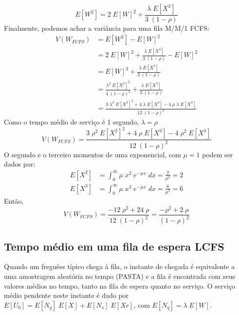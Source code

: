 \documentclass[a4paper]{article}
\newcommand{\E}[1]{E\!\left[#1\right]}
\begin{document}
\[
    \E{W^2}
    = 2 \; \E{W}^2 + \frac{\lambda \; \E{X^3}}{3 \; (1 - \rho)}
\]
Finalmente, podemos achar a variância para uma fila M/M/1 FCFS:
\begin{align*}
    V(W_{FCFS}) &= \E{W^2} - \E{W}^2 \\
    &= 2 \; \E{W}^2 + \frac{\lambda \; \E{X^3}}{3 \; (1 - \rho)}
        - \E{W}^2 \\
    &= \E{W}^2 + \frac{\lambda \; \E{X^3}}{3 \; (1 - \rho)} \\
    &= \frac{\lambda^2 \; \E{X^2}^2}{4 \; (1 - \rho)^2}
        + \frac{\lambda \; \E{X^3}}{3 \; (1 - \rho)} \\
    &= \frac{3 \; \lambda^2 \; \E{X^2}^2 + 4 \; \lambda \; \E{X^3}
        - 4 \; \rho \; \lambda \; \E{X^3}}{12 \; (1 - \rho)^2}
    \end{align*}
Como o tempo médio de serviço é 1 segundo, \(\lambda = \rho\)
\[
    V(W_{FCFS}) = \frac{3 \; \rho^2 \; \E{X^2}^2
        + 4 \; \rho \; \E{X^3} - 4 \; \rho^2 \; \E{X^3}}{12
        \; (1 - \rho)^2}
\]
O segundo e o terceiro momentos de uma exponencial,
com \(\mu = 1\) podem ser dados por:
\begin{align*}
    \E{X^2}
        &= \int_{0}^{\infty} \mu \; x^2 \; e^{-\mu x} \; dx
        = \frac{2}{\mu^2} = 2 \\
    \E{X^3}
        &= \int_{0}^{\infty} \mu \; x^3 \; e^{-\mu x} \; dx
        = \frac{6}{\mu^3} = 6
\end{align*}
Então,
\[
    V(W_{FCFS})
    = \frac{-12 \; \rho^2 + 24 \; \rho}{12 \; (1 - \rho)^2} = \frac{-\rho^2 + 2 \; \rho}{(1 - \rho)^2}
\]
\subsection{Tempo médio em uma fila de espera LCFS}
Quando um freguêes típico chega à fila, o instante de chegada
é equivalente a uma amostragem aleatória no tempo (PASTA)
e a fila  é encontrada com seus valores médios no tempo,
tanto na fila de espera quanto no serviço.
O serviço médio pendente neste instante  é dado
por \(\E{U_0} = \E{N_q}\;\E{X} + \E{N_s}\;\E{Xr}\), com \(\E{N_q} = \lambda\;\E{W}\).
\end{document}
